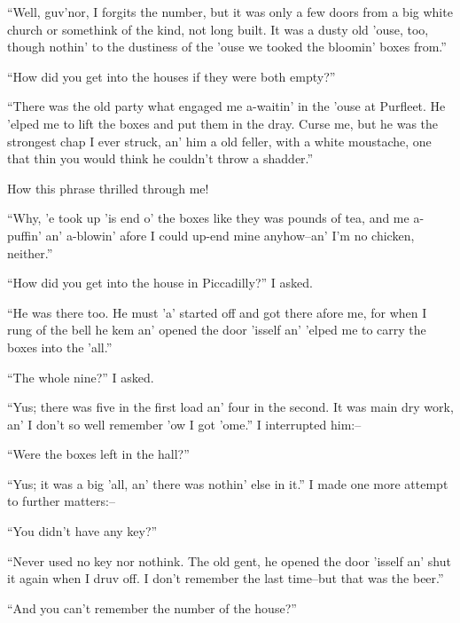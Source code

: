 \documentclass[12pt,openright]{book}
\begin{document}
“Well, guv’nor, I forgits the number, but it was only a few doors from a big white church or somethink of the kind, not long built. It was a dusty old ’ouse, too, though nothin’ to the dustiness of the ’ouse we tooked the bloomin’ boxes from.”

“How did you get into the houses if they were both empty?”

“There was the old party what engaged me a-waitin’ in the ’ouse at Purfleet. He ’elped me to lift the boxes and put them in the dray. Curse me, but he was the strongest chap I ever struck, an’ him a old feller, with a white moustache, one that thin you would think he couldn’t throw a shadder.”

How this phrase thrilled through me!

“Why, ’e took up ’is end o’ the boxes like they was pounds of tea, and me a-puffin’ an’ a-blowin’ afore I could up-end mine anyhow–an’ I’m no chicken, neither.”

“How did you get into the house in Piccadilly?” I asked.

“He was there too. He must ’a’ started off and got there afore me, for when I rung of the bell he kem an’ opened the door ’isself an’ ’elped me to carry the boxes into the ’all.”

“The whole nine?” I asked.

“Yus; there was five in the first load an’ four in the second. It was main dry work, an’ I don’t so well remember ’ow I got ’ome.” I interrupted him:–

“Were the boxes left in the hall?”

“Yus; it was a big ’all, an’ there was nothin’ else in it.” I made one more attempt to further matters:–

“You didn’t have any key?”

“Never used no key nor nothink. The old gent, he opened the door ’isself an’ shut it again when I druv off. I don’t remember the last time–but that was the beer.”

“And you can’t remember the number of the house?”
\end{document}
